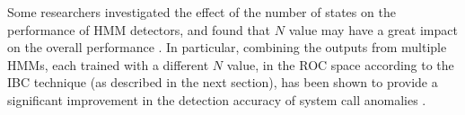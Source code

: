 Some researchers investigated the effect of the number of states on the performance of HMM detectors, and found that $N$ value may have a great impact on the overall performance \cite{Yeung2003,Khreich2009-ICC}.
In particular, combining the outputs from multiple HMMs, each trained with a different $N$ value, in the ROC space according to the IBC technique (as described in the next section), has been shown to provide a significant improvement in the detection accuracy of system call anomalies \cite{Khreich2010-ICPR}.
 
